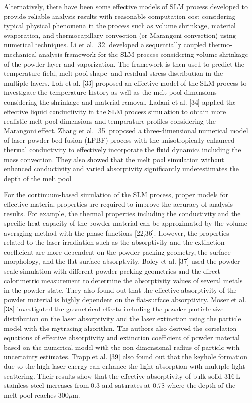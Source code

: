 \documentclass[10pt]{article}
\begin{document}
Alternatively, there have been some effective models of SLM process developed to provide reliable analysis results with reasonable computation cost considering typical physical phenomena in the process such as volume shrinkage, material evaporation, and thermocapillary convection (or Marangoni convection) using numerical techniques. Li et al. [32] developed a sequentially coupled thermo-mechanical analysis framework for the SLM process considering volume shrinkage of the powder layer and vaporization. The framework is then used to predict the temperature field, melt pool shape, and residual stress distribution in the multiple layers. Loh et al. [33] proposed an effective model of the SLM process to investigate the temperature history as well as the melt pool dimensions considering the shrinkage and material removal. Ladani et al. [34] applied the effective liquid conductivity in the SLM process simulation to obtain more realistic melt pool dimensions and temperature profiles considering the Marangoni effect. Zhang et al. [35] proposed a three-dimensional numerical model of laser powder-bed fusion (LPBF) process with the anisotropically enhanced thermal conductivity to effectively incorporate the fluid dynamics including the mass convection. They also showed that the melt pool simulation without enhanced conductivity and varied absorptivity significantly underestimates the depth of the melt pool.

For the continuum-based simulation of the SLM process, proper models for effective material properties are required to improve the accuracy of analysis results. For example, the thermal properties including the conductivity and the specific heat capacity of the powder material can be approximated by the volume averaging method with the phase functions [22,36]. However, the properties related to the laser irradiation such as the absorptivity and the extinction coefficient are more dependent on the powder packing geometry, the surface morphology, and the flat-surface absorptivity. Boley et al. [37] used the powder-scale simulation with different powder packing geometries and the direct calorimetric measurement to determine the absorptivity values of several metals in the powder state. They also found out that the effective absorptivity of the powder material is highly dependent on the flat-surface absorptivity. Moser et al. [38] investigated the geometrical effects including the powder particle size distribution on the laser absorptivity and the laser extinction using the particle model with the raytracing algorithm. The authors also derived the correlation equations of effective absorptivity and extinction coefficient of powder material based on the numerical model with the non-dimensional radius of particle with uncertainty estimates. Trapp et al. [39] also found out that the keyhole formation due to the high laser energy can enhance the light absorption with multiple light scattering. Their results show that the effective absorptivity of bulk solid $316 \mathrm{~L}$ stainless steel increases from 0.3 and saturates at 0.78 where the depth of the melt pool reaches $300 \mu \mathrm{m}$.
\end{document}
